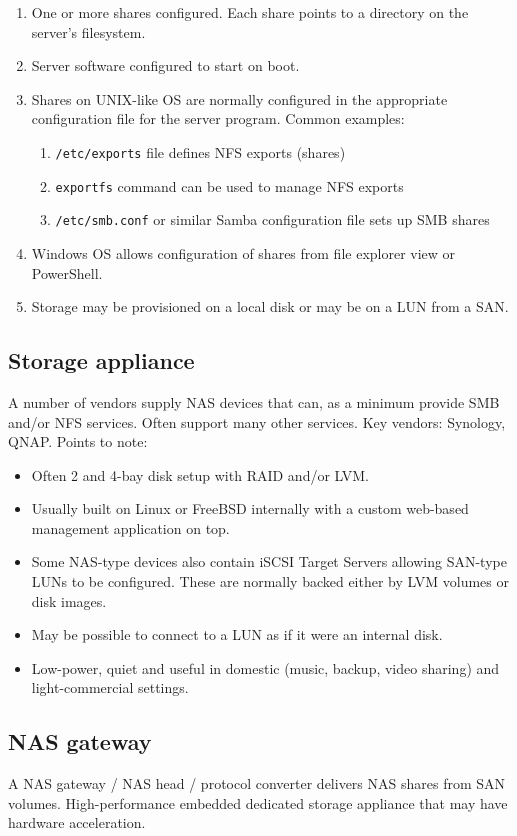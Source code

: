 \begin{enumerate}
\def\labelenumi{\arabic{enumi}.}
\item
  One or more shares configured. Each share points to a directory on the
  server's filesystem.
\item
  Server software configured to start on boot.
\item
  Shares on UNIX-like OS are normally configured in the appropriate
  configuration file for the server program. Common examples:

  \begin{enumerate}
  \def\labelenumii{\arabic{enumii}.}
  \item
    \texttt{/etc/exports} file defines NFS exports (shares)
  \item
    \texttt{exportfs} command can be used to manage NFS exports
  \item
    \texttt{/etc/smb.conf} or similar Samba configuration file sets up
    SMB shares
  \end{enumerate}
\item
  Windows OS allows configuration of shares from file explorer view or
  PowerShell.
\item
  Storage may be provisioned on a local disk or may be on a LUN from a
  SAN.
\end{enumerate}

\subsection{Storage appliance}\label{storage-appliance}

A number of vendors supply NAS devices that can, as a minimum provide
SMB and/or NFS services. Often support many other services. Key vendors:
Synology, QNAP. Points to note:

\begin{itemize}
\item
  Often 2 and 4-bay disk setup with RAID and/or LVM.
\item
  Usually built on Linux or FreeBSD internally with a custom web-based
  management application on top.
\item
  Some NAS-type devices also contain iSCSI Target Servers allowing
  SAN-type LUNs to be configured. These are normally backed either by
  LVM volumes or disk images.
\item
  May be possible to connect to a LUN as if it were an internal disk.
\item
  Low-power, quiet and useful in domestic (music, backup, video sharing)
  and light-commercial settings.
\end{itemize}

\subsection{NAS gateway}\label{nas-gateway}

A NAS gateway / NAS head / protocol converter delivers NAS shares from
SAN volumes. High-performance embedded dedicated storage appliance that
may have hardware acceleration.
